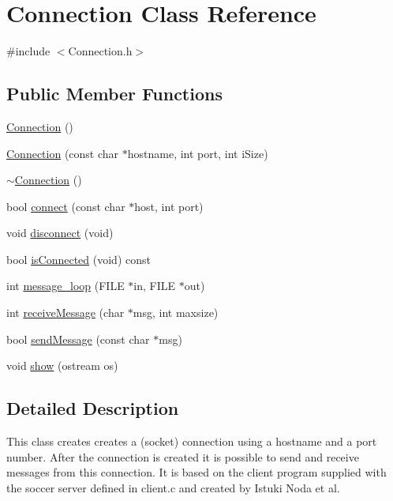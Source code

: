 \hypertarget{classConnection}{}\section{Connection Class Reference}
\label{classConnection}


{\ttfamily \#include $<$Connection.\+h$>$}

\subsection*{Public Member Functions}
\begin{DoxyCompactItemize}
\item 
\hyperlink{classConnection_a9de94289ca6259f94ef6aeba3b134a77}{Connection} ()
\item 
\hyperlink{classConnection_a516e1f95043699444b93f18c66bae135}{Connection} (const char $\ast$hostname, int port, int i\+Size)
\item 
\hyperlink{classConnection_a2e4352edf667bea83001569e9da8a24d}{$\sim$\+Connection} ()
\item 
bool \hyperlink{classConnection_a86f2e0e54431665344792b320822f5fd}{connect} (const char $\ast$host, int port)
\item 
void \hyperlink{classConnection_a714de28673587d857578e0688a149165}{disconnect} (void)
\item 
bool \hyperlink{classConnection_ab9e18d6cd27e0fccf418b339cd92dac6}{is\+Connected} (void) const 
\item 
int \hyperlink{classConnection_af07c0c3856f7e792468ea721db559b39}{message\+\_\+loop} (F\+I\+LE $\ast$in, F\+I\+LE $\ast$out)
\item 
int \hyperlink{classConnection_aee982599863402416879fcb6ba62aa3e}{receive\+Message} (char $\ast$msg, int maxsize)
\item 
bool \hyperlink{classConnection_aba5adce5ec0031c6cc057980538b06e8}{send\+Message} (const char $\ast$msg)
\item 
void \hyperlink{classConnection_af818a3027bec5ee2cc68515c58720daa}{show} (ostream os)
\end{DoxyCompactItemize}


\subsection{Detailed Description}
This class creates creates a (socket) connection using a hostname and a port number. After the connection is created it is possible to send and receive messages from this connection. It is based on the client program supplied with the soccer server defined in client.\+c and created by Istuki Noda et al. 

